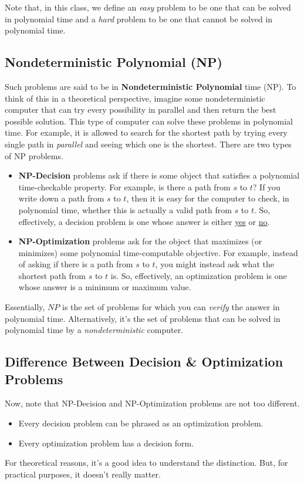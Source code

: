 \documentclass[letterpaper]{article}
\begin{document}
\bigskip 

Note that, in this class, we define an \emph{easy} problem to be one that can be solved in polynomial time and a \emph{hard} problem to be one that cannot be solved in polynomial time. 

\subsection{Nondeterministic Polynomial (NP)}
Such problems are said to be in \textbf{Nondeterministic Polynomial} time (NP). To think of this in a theoretical perspective, imagine some nondeterministic computer that can try every possibility in parallel and then return the best possible solution. This type of computer can solve these problems in polynomial time. For example, it is allowed to search for the shortest path by trying every single path in \emph{parallel} and seeing which one is the shortest. There are two types of NP problems.
\begin{itemize}
    \item \textbf{NP-Decision} problems ask if there is some object that satisfies a polynomial time-checkable property. For example, is there a path from $s$ to $t$? If you write down a path from $s$ to $t$, then it is easy for the computer to check, in polynomial time, whether this is actually a valid path from $s$ to $t$. So, effectively, a decision problem is one whose answer is either \underline{yes} or \underline{no}.
    \item \textbf{NP-Optimization} problems ask for the object that maximizes (or minimizes) some polynomial time-computable objective. For example, instead of asking if there is a path from $s$ to $t$, you might instead ask what the shortest path from $s$ to $t$ is. So, effectively, an optimization problem is one whose answer is a minimum or maximum value. 
\end{itemize}
Essentially, $NP$ is the set of problems for which you can \emph{verify} the answer in polynomial time. Alternatively, it's the set of problems that can be solved in polynomial time by a \emph{nondeterministic} computer. 

\subsection{Difference Between Decision \& Optimization Problems}
Now, note that NP-Decision and NP-Optimization problems are not too different. 
\begin{itemize}
    \item Every decision problem can be phrased as an optimization problem.
    \item Every optimization problem has a decision form.
\end{itemize}
For theoretical reasons, it's a good idea to understand the distinction. But, for practical purposes, it doesn't really matter. 
\end{document}
